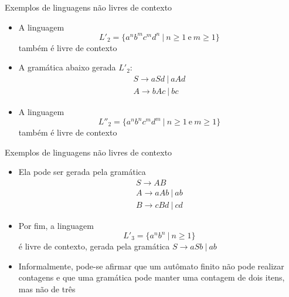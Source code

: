 \begin{frame}[fragile]{Exemplos de linguagens não livres de contexto}

    \begin{itemize}
        \item A linguagem
        \[
            L'_2 = \{ a^nb^mc^md^n\ |\ n\geq 1\ \mbox{e}\ m\geq 1\}
        \]
        também é livre de contexto

        \item A gramática abaixo gerada $L'_2$:
        \[
            \begin{array}{l}
                S \to aSd\ |\ aAd \\
                A \to bAc\ |\ bc
            \end{array}
        \]

        \item A linguagem
        \[
            L''_2 = \{ a^nb^nc^md^m\ |\ n\geq 1\ \mbox{e}\ m\geq 1\}
        \]
        também é livre de contexto

        \end{itemize}

\end{frame}

\begin{frame}[fragile]{Exemplos de linguagens não livres de contexto}

    \begin{itemize}
        \item Ela pode ser gerada pela gramática
        \[
            \begin{array}{l}
                S \to AB \\
                A \to aAb\ |\ ab \\
                B \to cBd\ |\ cd
            \end{array}
        \]

        \item Por fim, a linguagem
        \[
            L'_3 = \{ a^nb^n\ |\ n\geq 1\}
        \]
        é livre de contexto, gerada pela gramática $S\to aSb\ |\ ab$

        \item Informalmente, pode-se afirmar que um autômato finito não pode realizar contagens e que uma gramática pode manter uma contagem de dois itens, mas
            não de três
    \end{itemize}

\end{frame}
